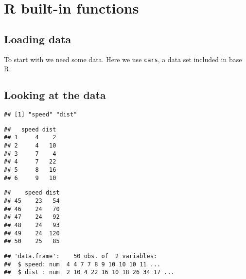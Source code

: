 \documentclass[paper=a4,headsepline,BCOR=12mm,twoside,open=right,%
titlepage,headings=small,fontsize=10pt,index=totoc,bibliography=totoc,%
captions=tableheading,captions=nooneline]{scrbook}\usepackage{knitr}
\begin{document}
\chapter{R built-in functions}


\section{Loading data}

To start with we need some data. Here we use \texttt{cars}, a data set included in base R.

\begin{knitrout}\footnotesize
{}\color{fgcolor}\begin{kframe}
\begin{alltt}
\end{alltt}
\end{kframe}
\end{knitrout}

\section{Looking at the data}

\begin{knitrout}\footnotesize
{}\color{fgcolor}\begin{kframe}
\begin{alltt}
\end{alltt}
\begin{verbatim}
## [1] "speed" "dist"
\end{verbatim}
\begin{alltt}
\end{alltt}
\begin{verbatim}
##   speed dist
## 1     4    2
## 2     4   10
## 3     7    4
## 4     7   22
## 5     8   16
## 6     9   10
\end{verbatim}
\begin{alltt}
\end{alltt}
\begin{verbatim}
##    speed dist
## 45    23   54
## 46    24   70
## 47    24   92
## 48    24   93
## 49    24  120
## 50    25   85
\end{verbatim}
\begin{alltt}
\end{alltt}
\begin{verbatim}
## 'data.frame':	50 obs. of  2 variables:
##  $ speed: num  4 4 7 7 8 9 10 10 10 11 ...
##  $ dist : num  2 10 4 22 16 10 18 26 34 17 ...
\end{verbatim}
\end{kframe}
\end{knitrout}
\end{document}
